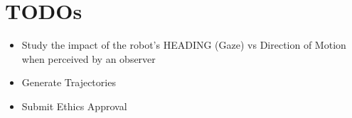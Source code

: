 \setcounter{section}{-1} %
\section{TODOs}

\begin{itemize}
    \item Study the impact of the robot's HEADING (Gaze) vs Direction of Motion when perceived by an observer
    
    \item Generate Trajectories
    
    \item Submit Ethics Approval
\end{itemize}

